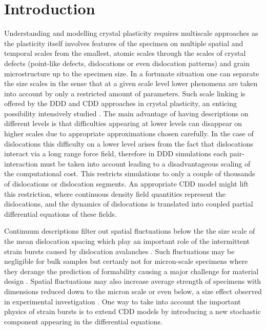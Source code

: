 \section{Introduction}
Understanding and modelling crystal plasticity requires multiscale approaches as the plasticity itself involves features of the specimen on multiple spatial and temporal scales from the smallest, atomic scales through the scales of crystal defects (point-like defects, dislocations or even dislocation patterns) and grain microstructure up to the specimen size. In a fortunate situation one can separate the size scales in the sense that at a given scale level lower phenomena are taken into account by only a restricted amount of parameters. Such scale linking is offered by the DDD and CDD approaches in crystal plasticity, an enticing possibility intensively studied \cite{Groma_2003_AM,PhysRevLett.114.015503,Hochrainer_2014_JMPS,POH2013913,LEVKOVITCH20067246,doi:10.1080/14786430600972921}. The main advantage of having descriptions on different levels is that difficulties appearing at lower levels can disappear on higher scales due to appropriate approximations chosen carefully. In the case of dislocations this difficulty on a lower level arises from the fact that dislocations interact via a long range force field, therefore in DDD simulations each pair-interaction must be taken into account leading to a disadvantageous scaling of the computational cost. This restricts simulations to only a couple of thousands of dislocations or dislocation segments. An appropriate CDD model might lift this restriction, where continuous density field quantities represent the dislocations, and the dynamics of dislocations is translated into coupled partial differential equations of these fields.

Continuum descriptions filter out spatial fluctuations below the the size scale of the mean dislocation spacing which play an important role of the intermittent strain bursts caused by dislocation avalanches \cite{doi:10.1080/14786430802132522,Dimiduk1188}. Such fluctuations may be negligible for bulk samples but certanly not for micron-scale specimens where they derange the prediction of formability causing a major challenge for material design \cite{Csikor251}. Spatial fluctuations may also increase average strength of specimens with dimensions reduced down to the micron scale or even below, a size effect observed in experimental investigation \cite{DIMIDUK20054065,Dimiduk1188,doi:10.1146/annurev-matsci-082908-145422}. One way to take into account the important physics of strain bursts is to extend CDD models by introducing a new stochastic component appearing in the differential equations.


